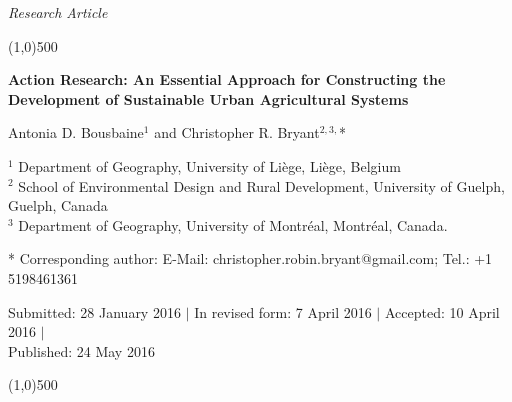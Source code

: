 \documentclass[10pt,a4paper]{article}
\begin{document}
\flushcolumns
\raggedcolumns



\pagestyle{document}
\thispagestyle{firstpage}


\vspace*{70pt}

\setlength{\parindent}{0cm}
\textit{Research Article}
\vspace*{-12pt}

\begin{center}
\line(1,0){500}
\end{center}

\vspace*{12pt}
\begin{flushleft}
\begin{LARGE}
\textbf{{\color{librellogreen} Action Research: An Essential Approach for Constructing the Development of Sustainable Urban Agricultural Systems}}\\
\end{LARGE}

\vspace*{12pt}
Antonia D. Bousbaine$^1$ and Christopher R. Bryant$^{2,3,}$*

\vspace*{6pt}

$^1$ Department of Geography, University of Liège, Liège, Belgium\\
$^2$ School of Environmental Design and Rural Development, University of Guelph, Guelph, Canada\\
$^3$ Department of Geography, University of Montréal, Montréal, Canada.

\vspace*{6pt}

* Corresponding author: E-Mail: christopher.robin.bryant@gmail.com; Tel.: +1 5198461361\\
\vspace*{6pt}

Submitted: 28 January 2016 $\mid$ In revised form: 7 April 2016 $\mid$ Accepted: 10 April 2016 $\mid$\\
Published: 24 May 2016
\end{flushleft}
\setcounter{page}{20}


\vspace*{-18pt}
\begin{center}
\line(1,0){500}
\end{center}

\vspace*{12pt}
\end{document}
